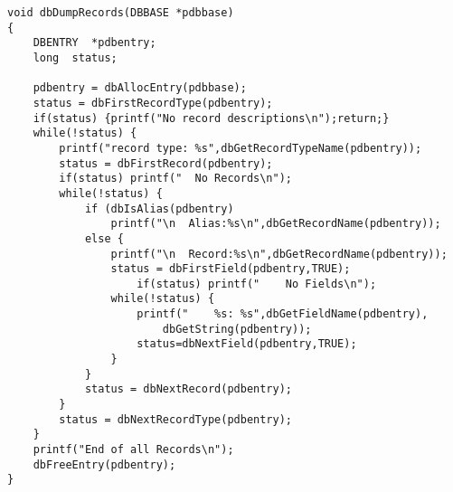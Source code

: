\begin{verbatim}
void dbDumpRecords(DBBASE *pdbbase)
{
    DBENTRY  *pdbentry;
    long  status;

    pdbentry = dbAllocEntry(pdbbase);
    status = dbFirstRecordType(pdbentry);
    if(status) {printf("No record descriptions\n");return;}
    while(!status) {
        printf("record type: %s",dbGetRecordTypeName(pdbentry));
        status = dbFirstRecord(pdbentry);
        if(status) printf("  No Records\n"); 
        while(!status) {
            if (dbIsAlias(pdbentry)
                printf("\n  Alias:%s\n",dbGetRecordName(pdbentry));
            else {
                printf("\n  Record:%s\n",dbGetRecordName(pdbentry));
                status = dbFirstField(pdbentry,TRUE);
                    if(status) printf("    No Fields\n");
                while(!status) {
                    printf("    %s: %s",dbGetFieldName(pdbentry),
                        dbGetString(pdbentry));
                    status=dbNextField(pdbentry,TRUE);
                }
            }
            status = dbNextRecord(pdbentry);
        }
        status = dbNextRecordType(pdbentry);
    }
    printf("End of all Records\n");
    dbFreeEntry(pdbentry);
}
\end{verbatim}
